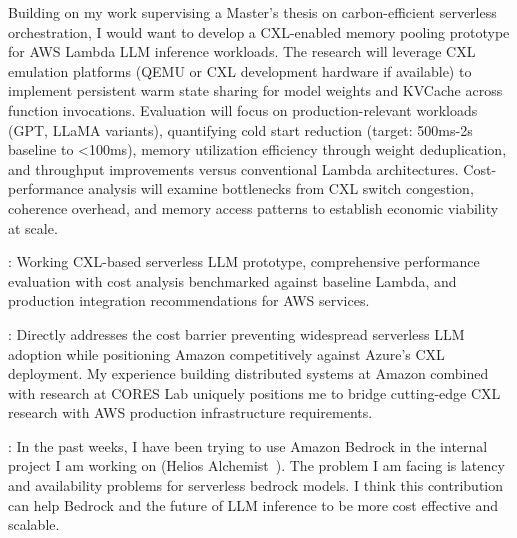 \documentclass[a4paper]{article}
\begin{document}
Building on my work supervising a Master's thesis on carbon-efficient serverless orchestration, I would want to develop a CXL-enabled memory pooling prototype for AWS Lambda LLM inference workloads. The research will leverage CXL emulation platforms (QEMU or CXL development hardware if available) to implement persistent warm state sharing for model weights and KVCache across function invocations. Evaluation will focus on production-relevant workloads (GPT, LLaMA variants), quantifying cold start reduction (target: 500ms-2s baseline to <100ms), memory utilization efficiency through weight deduplication, and throughput improvements versus conventional Lambda architectures. Cost-performance analysis will examine bottlenecks from CXL switch congestion, coherence overhead, and memory access patterns to establish economic viability at scale.

: Working CXL-based serverless LLM prototype, comprehensive performance evaluation with cost analysis benchmarked against baseline Lambda, and production integration recommendations for AWS services. 

: Directly addresses the cost barrier preventing widespread serverless LLM adoption while positioning Amazon competitively against Azure's CXL deployment. My experience building distributed systems at Amazon combined with research at CORES Lab uniquely positions me to bridge cutting-edge CXL research with AWS production infrastructure requirements. 

: In the past weeks, I have been trying to use Amazon Bedrock in the internal project I am working on (Helios Alchemist~). The problem I am facing is latency and availability problems for serverless bedrock models. I think this contribution can help Bedrock and the future of LLM inference to be more cost effective and scalable.

\end{document}
